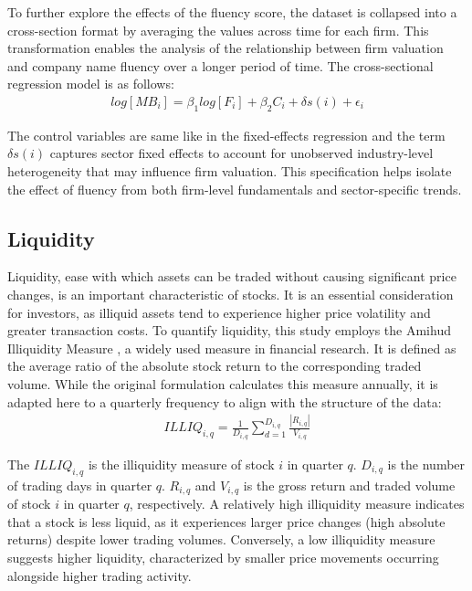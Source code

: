\documentclass[a4paper,11pt]{report}
\begin{document}
To further explore the effects of the fluency score, the dataset is collapsed into a cross-section format by averaging the values across time for each firm. This transformation enables the analysis of the relationship between firm valuation and company name fluency over a longer period of time. The cross-sectional regression model is as follows:
\begin{align}
    log \left[MB_{i}\right] = \beta_1 log\left[F_{i}\right] + {\beta_2} C_{i} + \delta{s(i)} + \epsilon_{i}
\end{align}

The control variables are same like in the fixed-effects regression and the term $\delta{s(i)}$ captures sector fixed effects to account for unobserved industry-level heterogeneity that may influence firm valuation. This specification helps isolate the effect of fluency from both firm-level fundamentals and sector-specific trends.

\subsection{Liquidity}
Liquidity, ease with which assets can be traded without causing significant price changes, is an important characteristic of stocks. It is an essential consideration for investors, as illiquid assets tend to experience higher price volatility and greater transaction costs. To quantify liquidity, this study employs the Amihud Illiquidity Measure \cite{amihud}, a widely used measure in financial research. It is defined as the average ratio of the absolute stock return to the corresponding traded volume. While the original formulation calculates this measure annually, it is adapted here to a quarterly frequency to align with the structure of the data:
\begin{align}
    ILLIQ_{i,q} = \frac{1}{D_{i,q}} \sum_{d=1}^{D_{i,q}} \frac{|R_{i,q}|}{V_{i,q}}
\end{align}

The $ILLIQ_{i,q}$ is the illiquidity measure of stock $i$ in quarter $q$. $D_{i,q}$ is the number of trading days in quarter $q$. $R_{i,q}$ and $V_{i,q}$ is the gross return and traded volume of stock 
$i$ in quarter $q$, respectively. A relatively high illiquidity measure indicates that a stock is less liquid, as it experiences larger price changes (high absolute returns) despite lower trading volumes. Conversely, a low illiquidity measure suggests higher liquidity, characterized by smaller price movements occurring alongside higher trading activity.
\end{document}
